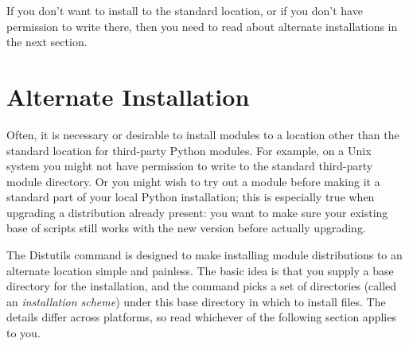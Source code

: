 \documentclass{howto}
\begin{document}
If you don't want to install to the standard location, or if you don't
have permission to write there, then you need to read about alternate
installations in the next section.



\newcommand{\installscheme}[8]
  {\begin{tableiii}{lll}{textrm}
          {Type of file}
          {Installation Directory}
          {Override option}
     \lineiii{pure module distribution}
             {\filevar{#1}\filenq{#2}}
             {\option{--install-purelib}}
     \lineiii{non-pure module distribution}
             {\filevar{#3}\filenq{#4}}
             {\option{--install-platlib}}
     \lineiii{scripts}
             {\filevar{#5}\filenq{#6}}
             {\option{--install-scripts}}
     \lineiii{data}
             {\filevar{#7}\filenq{#8}}
             {\option{--install-data}}
   \end{tableiii}}

\section{Alternate Installation}
\label{sec:alt-install}

Often, it is necessary or desirable to install modules to a location
other than the standard location for third-party Python modules.  For
example, on a Unix system you might not have permission to write to the
standard third-party module directory.  Or you might wish to try out a
module before making it a standard part of your local Python
installation; this is especially true when upgrading a distribution
already present: you want to make sure your existing base of scripts
still works with the new version before actually upgrading.

The Distutils  command is designed to make installing
module distributions to an alternate location simple and painless.  The
basic idea is that you supply a base directory for the installation, and
the  command picks a set of directories (called an
\emph{installation scheme}) under this base directory in which to
install files.  The details differ across platforms, so read whichever
of the following section applies to you.
\end{document}
